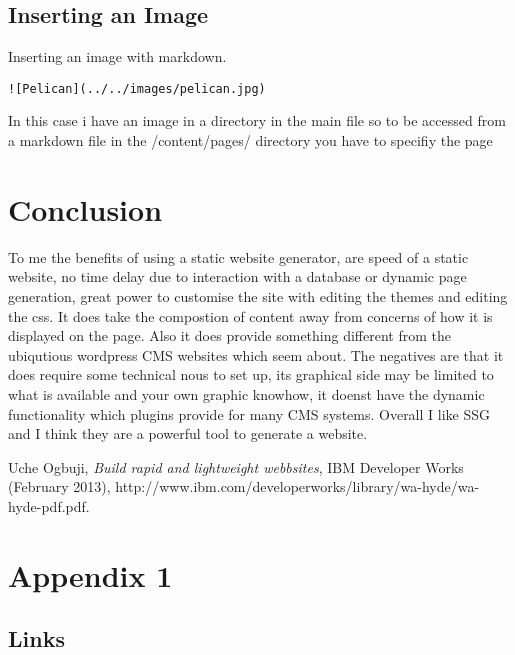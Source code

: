 \documentclass[12pt]{article}			%
\begin{document}
\subsection{Inserting an Image}
Inserting an image with markdown.
\begin{verbatim}
![Pelican](../../images/pelican.jpg)
\end{verbatim}
In this case i have an image in a directory in the main file so to be accessed from a markdown file in the /content/pages/ directory you have to specifiy the page


\newpage
\section{Conclusion}
To me the benefits of using a static website generator, are speed of a static website,
no time delay due to interaction with a database or dynamic page generation, great power to customise the site with editing the themes and editing the css. It does take the compostion of content away from concerns of how it is displayed on the page.
Also it does provide something different from the ubiqutious wordpress CMS websites which seem about.
The negatives are that it does require some technical nous to set up, its graphical side may be limited to what is available and your own graphic knowhow, it doenst have the dynamic functionality which plugins provide for many CMS systems.
Overall I like SSG and I think they are a powerful tool to generate a website.


\newpage
\begin{thebibliography}{9}

 Uche Ogbuji, \emph{Build rapid and lightweight webbsites}, IBM Developer Works (February 2013), http://www.ibm.com/developerworks/library/wa-hyde/wa-hyde-pdf.pdf.  
\end{thebibliography}



\newpage
\appendix
\section{Appendix 1}
\subsection{Links}
\end{document}
